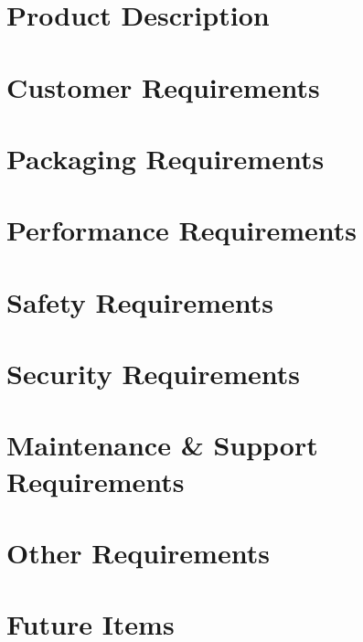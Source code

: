 \documentclass[11pt,letterpaper]{article}
\begin{document}
\section{Product Description}

\newpage
\section{Customer Requirements}

\newpage
\section{Packaging Requirements}

\newpage
\section{Performance Requirements}

\newpage
\section{Safety Requirements}

\newpage
\section{Security Requirements}

\newpage
\section{Maintenance \& Support Requirements}

\newpage
\section{Other Requirements}

\newpage
\section{Future Items}

\newpage
\end{document}
